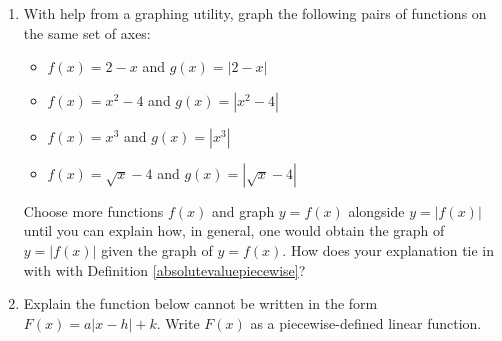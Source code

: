\newpage

\begin{enumerate}
\setcounter{enumi}{\value{HW}}

\item \label{makeaveewithabsval} With help from a graphing utility, graph the following pairs of functions on the same set of axes:

\begin{multicols}{2}

\begin{itemize}


\item  $f(x) = 2-x$ and $g(x) = | 2-x |$

\item  $f(x) = x^2-4$ and $g(x) = | x^2 -4 |$

\end{itemize}

\end{multicols}

\begin{multicols}{2}

\begin{itemize}

\item  $f(x) = x^3$ and $g(x) = | x^3 |$

\item  $f(x) = \sqrt{x}-4 $ and $g(x) = | \sqrt{x} -4| $

\end{itemize}

\end{multicols}


Choose more functions $f(x)$ and graph $y = f(x)$ alongside $y = | f(x)|$ until you can explain how, in general, one would obtain the graph of $y = | f(x) |$ given the graph of $y = f(x)$.  How does your explanation tie in with  with Definition \ref{absolutevaluepiecewise}?



\item Explain the function below cannot be written in the form $F(x) = a|x-h|+k$.  Write $F(x)$ as a piecewise-defined linear function.

\begin{center}


\end{center}
\end{enumerate}
